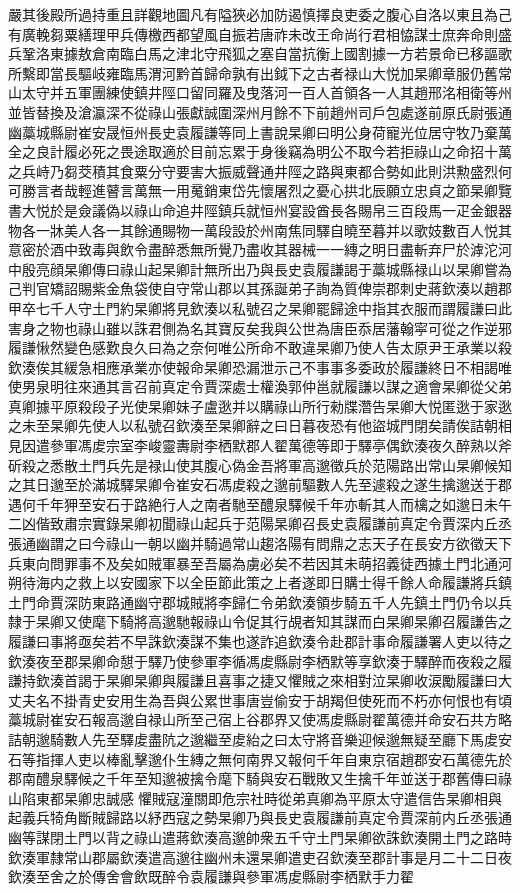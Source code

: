 嚴其後殿所過持重且詳觀地圖凡有隘狹必加防遏慎擇良吏委之腹心自洛以東且為己有廣輓芻粟繕理甲兵傳檄西都望風自振若唐祚未改王命尚行君相恊謀士庶奔命則盛兵鞏洛東據敖倉南臨白馬之津北守飛狐之塞自當抗衡上國割據一方若景命已移謳歌所繫即當長驅岐雍臨馬渭河黔首歸命孰有出鉞下之古者禄山大悦加杲卿章服仍舊常山太守并五軍團練使鎮井陘口留同羅及曳落河一百人首領各一人其趙邢洺相衛等州並皆替換及滄瀛深不從祿山張獻誠圍深州月餘不下前趙州司戶包處遂前原氏尉張通幽藁城縣尉崔安晟恒州長史袁履謙等同上書說杲卿曰明公身荷寵光位居守牧乃棄萬全之良計履必死之畏途取適於目前忘累于身後竊為明公不取今若拒祿山之命招十萬之兵峙乃芻茭積其食粟分守要害大振威聲通井陘之路與東都合勢如此則洪勲盛烈何可勝言者哉輕進瞽言萬無一用䰟銷東岱先懷屠烈之憂心拱北辰願立忠貞之節杲卿覽書大悦於是僉議偽以祿山命追井陘鎮兵就恒州宴設酋長各賜帛三百段馬一疋金銀器物各一牀美人各一其餘通賜物一萬段設於州南焦同驛自曉至暮并以歌妓數百人悦其意密於酒中致毒與飲令盡醉悉無所覺乃盡收其器械一一縳之明日盡斬弃尸於滹沱河中殷亮顔杲卿傳曰祿山起杲卿計無所出乃與長史袁履謙謁于藁城縣禄山以杲卿嘗為己判官矯詔賜紫金魚袋使自守常山郡以其孫誕弟子詢為質俾崇郡刺史蔣欽湊以趙郡甲卒七千人守土門約杲卿將見欽湊以私號召之杲卿罷歸途中指其衣服而謂履謙曰此害身之物也祿山雖以誅君側為名其寶反矣我與公世為唐臣忝居藩翰寜可從之作逆邪履謙愀然變色感歎良久曰為之奈何唯公所命不敢違杲卿乃使人告太原尹王承業以殺欽湊俟其緩急相應承業亦使報命杲卿恐漏泄示己不事事多委政於履謙終日不相謁唯使男泉明往來通其言召前真定令賈深處士權渙郭仲邕就履謙以謀之適會杲卿從父弟真卿據平原殺段子光使杲卿妹子盧逖并以購祿山所行勑牒濳告杲卿大悦匿逖于家逖之未至杲卿先使人以私號召欽湊至杲卿辭之曰日暮夜恐有他盜城門閉矣請俟詰朝相見因遣參軍馮䖍宗室李峻靈夀尉李栖默郡人翟萬德等即于驛亭偶欽湊夜久醉熟以斧斫殺之悉散土門兵先是禄山使其腹心偽金吾將軍高邈徵兵於范陽路出常山杲卿候知之其日邈至於滿城驛杲卿令崔安石馮䖍殺之邈前驅數人先至遽殺之遂生擒邈送于郡遇何千年狎至安石于路絶行人之南者馳至醴泉驛候千年亦斬其人而檎之如邈日未午二凶偕致肅宗實錄杲卿初聞祿山起兵于范陽杲卿召長史袁履謙前真定令賈深内丘丞張通幽謂之曰今祿山一朝以幽并騎過常山趨洛陽有問鼎之志天子在長安方欲徵天下兵東向問罪事不及矣如賊軍暴至吾屬為虜必矣不若因其未萌招義徒西據土門北通河朔待海内之救上以安國家下以全臣節此策之上者遂即日購士得千餘人命履謙將兵鎮土門命賈深防東路通幽守郡城賊將李歸仁令弟欽湊領步騎五千人先鎮土門仍令以兵隸于杲卿又使麾下騎將高邈馳報祿山令促其行覘者知其謀而白杲卿杲卿召履謙告之履謙曰事將亟矣若不早誅欽湊謀不集也遂詐追欽湊令赴郡計事命履謙署人吏以待之欽湊夜至郡杲卿命憇于驛乃使參軍李循馮䖍縣尉李栖默等享欽湊于驛醉而夜殺之履謙持欽湊首謁于杲卿杲卿與履謙且喜事之捷又懼賊之來相對泣杲卿收涙勵履謙曰大丈夫名不掛青史安用生為吾與公累世事唐豈偷安于胡羯但使死而不朽亦何恨也有頃藁城尉崔安石報高邈自禄山所至己宿上谷郡界又使馮䖍縣尉翟萬德并命安石共方略詰朝邈騎數人先至驛䖍盡阬之邈繼至䖍紿之曰太守將音樂迎候邈無疑至廳下馬䖍安石等指揮人吏以棒亂擊邈仆生縳之無何南界又報何千年自東京宿趙郡安石萬德先於郡南醴泉驛候之千年至知邈被擒令麾下騎與安石戰敗又生擒千年並送于郡舊傳曰祿山陷東都杲卿忠誠感懼賊寇潼關即危宗社時從弟真卿為平原太守遣信告杲卿相與起義兵犄角斷賊歸路以紓西寇之勢杲卿乃與長史袁履謙前真定令賈深前内丘丞張通幽等謀閉土門以背之祿山遣蔣欽湊高邈帥衆五千守土門杲卿欲誅欽湊開土門之路時欽湊軍隸常山郡屬欽湊遣高邈往幽州未還杲卿遣吏召欽湊至郡計事是月二十二日夜欽湊至舍之於傳舍會飲既醉令袁履謙與參軍馮䖍縣尉李栖默手力翟